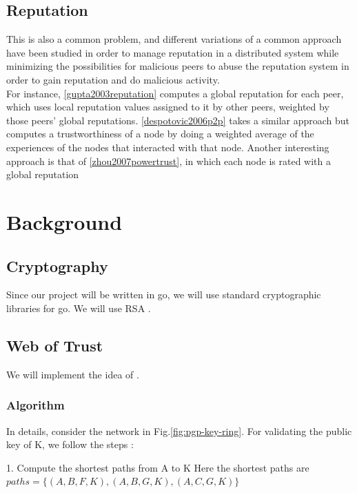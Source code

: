 \documentclass[]{article}
\begin{document}
        \subsection{Reputation}
        This is also a common problem, and different variations of a common approach have been studied in order to manage reputation in a distributed system while minimizing the possibilities for malicious peers to abuse the reputation system in order to gain reputation and do malicious activity.
        \\
        For instance, \ref{gupta2003reputation} computes a global reputation for each peer, which uses local reputation values assigned to it by other peers, weighted by those peers' global reputations.
        \ref{despotovic2006p2p} takes a similar approach but computes a trustworthiness of a node by doing a weighted average of the experiences of the nodes that interacted with that node.
        Another interesting approach is that of \ref{zhou2007powertrust}, in which each node is rated with a global reputation
        
    \section{Background}
    \label{sec:background}
        
        \subsection{Cryptography}
        Since our project will be written in go, we will use standard cryptographic libraries for go. We will use RSA \cite{RFC8017}.
        
        \subsection{Web of Trust}
        \label{sec:web-of-trust-spec}
        We will implement the idea of \cite{haenni2007new}.
        
        \subsubsection{Algorithm}
        In details, consider the network in Fig.\ref{fig:pgp-key-ring}. For validating the public key of K, we follow the steps :
        
        1. Compute the shortest paths from A to K \newline
        Here the shortest paths are $paths = \{(A,B,F,K), (A,B,G,K), (A,C,G,K)\}$
        
\end{document}
